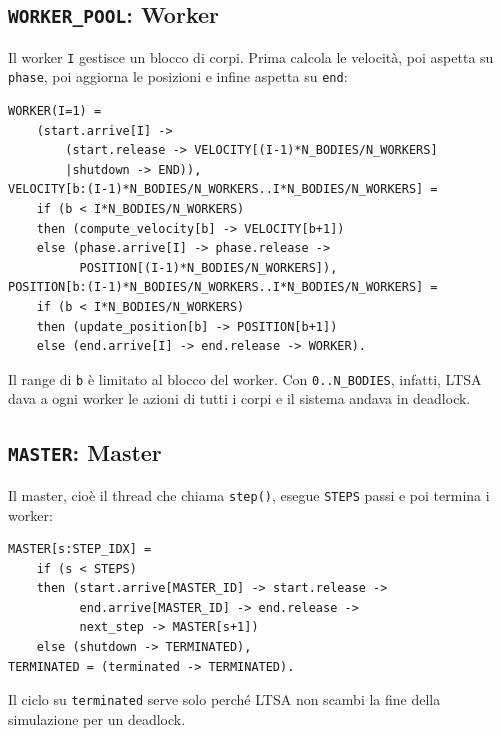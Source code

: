\subsection{\texttt{WORKER\_POOL}: Worker}
Il worker \texttt{I} gestisce un blocco di corpi.
Prima calcola le velocità, poi aspetta su \texttt{phase}, poi aggiorna le posizioni e infine aspetta su \texttt{end}:
\begin{lstlisting}[style=fsp]
WORKER(I=1) =
    (start.arrive[I] ->
        (start.release -> VELOCITY[(I-1)*N_BODIES/N_WORKERS]
        |shutdown -> END)),
VELOCITY[b:(I-1)*N_BODIES/N_WORKERS..I*N_BODIES/N_WORKERS] =
    if (b < I*N_BODIES/N_WORKERS)
    then (compute_velocity[b] -> VELOCITY[b+1])
    else (phase.arrive[I] -> phase.release ->
          POSITION[(I-1)*N_BODIES/N_WORKERS]),
POSITION[b:(I-1)*N_BODIES/N_WORKERS..I*N_BODIES/N_WORKERS] =
    if (b < I*N_BODIES/N_WORKERS)
    then (update_position[b] -> POSITION[b+1])
    else (end.arrive[I] -> end.release -> WORKER).
\end{lstlisting}
Il range di \texttt{b} è limitato al blocco del worker.
Con \texttt{0..N\_BODIES}, infatti, LTSA dava a ogni worker le azioni di tutti i corpi e il sistema andava in deadlock.

\subsection{\texttt{MASTER}: Master}
Il master, cioè il thread che chiama \texttt{step()}, esegue \texttt{STEPS} passi e poi termina i worker:
\begin{lstlisting}[style=fsp]
MASTER[s:STEP_IDX] =
    if (s < STEPS)
    then (start.arrive[MASTER_ID] -> start.release ->
          end.arrive[MASTER_ID] -> end.release ->
          next_step -> MASTER[s+1])
    else (shutdown -> TERMINATED),
TERMINATED = (terminated -> TERMINATED).
\end{lstlisting}
Il ciclo su \texttt{terminated} serve solo perché LTSA non scambi la fine della simulazione per un deadlock.

%
%
